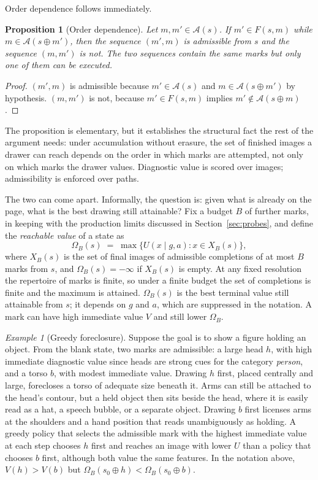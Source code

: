 \documentclass[11pt]{article}
\newtheorem{proposition}{Proposition}
\theoremstyle{remark}
\newtheorem*{example}{Example}
\newcommand{\A}{\mathcal{A}}
\begin{document}
Order dependence follows immediately.

\begin{proposition}[Order dependence]
\label{prop:order}
Let $m, m' \in \A(s)$. If $m' \in F(s,m)$ while $m \in \A(s \oplus m')$, then the sequence $(m', m)$ is admissible from $s$ and the sequence $(m, m')$ is not. The two sequences contain the same marks but only one of them can be executed.
\end{proposition}

\begin{proof}
$(m', m)$ is admissible because $m' \in \A(s)$ and $m \in \A(s \oplus m')$ by hypothesis. $(m, m')$ is not, because $m' \in F(s,m)$ implies $m' \notin \A(s \oplus m)$.
\end{proof}

The proposition is elementary, but it establishes the structural fact the rest of the argument needs: under accumulation without erasure, the set of finished images a drawer can reach depends on the order in which marks are attempted, not only on which marks the drawer values. Diagnostic value is scored over images; admissibility is enforced over paths.

The two can come apart. Informally, the question is: given what is already on the page, what is the best drawing still attainable? Fix a budget $B$ of further marks, in keeping with the production limits discussed in Section~\ref{sec:probes}, and define the \emph{reachable value} of a state as
\[
\Omega_B(s) \;=\; \max \big\{ U(x \mid g, a) : x \in X_B(s) \big\},
\]
where $X_B(s)$ is the set of final images of admissible completions of at most $B$ marks from $s$, and $\Omega_B(s) = -\infty$ if $X_B(s)$ is empty. At any fixed resolution the repertoire of marks is finite, so under a finite budget the set of completions is finite and the maximum is attained. $\Omega_B(s)$ is the best terminal value still attainable from $s$; it depends on $g$ and $a$, which are suppressed in the notation. A mark can have high immediate value $V$ and still lower $\Omega_B$.

\begin{example}[Greedy foreclosure]
Suppose the goal is to show a figure holding an object. From the blank state, two marks are admissible: a large head $h$, with high immediate diagnostic value since heads are strong cues for the category \emph{person}, and a torso $b$, with modest immediate value. Drawing $h$ first, placed centrally and large, forecloses a torso of adequate size beneath it. Arms can still be attached to the head's contour, but a held object then sits beside the head, where it is easily read as a hat, a speech bubble, or a separate object. Drawing $b$ first licenses arms at the shoulders and a hand position that reads unambiguously as holding. A greedy policy that selects the admissible mark with the highest immediate value at each step chooses $h$ first and reaches an image with lower $U$ than a policy that chooses $b$ first, although both value the same features. In the notation above, $V(h) > V(b)$ but $\Omega_B(s_0 \oplus h) < \Omega_B(s_0 \oplus b)$.
\end{example}
\end{document}
